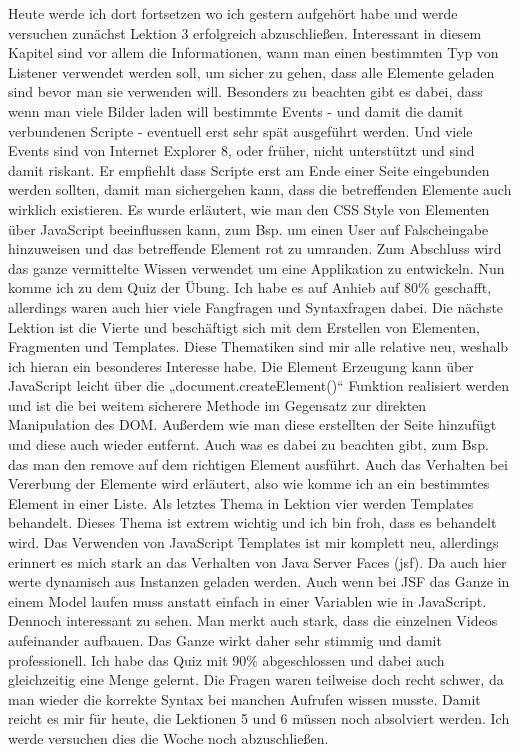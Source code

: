 \documentclass[12pt,a4paper,bibliography=totocnumbered,listof=totocnumbered]{scrartcl}
\begin{document}
Heute werde ich dort fortsetzen wo ich gestern aufgehört habe und werde versuchen zunächst Lektion 3 erfolgreich abzuschließen. 
Interessant in diesem Kapitel sind vor allem die Informationen, wann man einen bestimmten Typ von Listener verwendet werden soll, um sicher zu gehen, dass alle Elemente geladen sind bevor man sie verwenden will. Besonders zu beachten gibt es dabei, dass wenn man viele Bilder laden will bestimmte Events - und damit die damit verbundenen Scripte - eventuell erst sehr spät ausgeführt werden. Und viele Events sind von Internet Explorer 8, oder früher, nicht unterstützt und sind damit riskant. Er empfiehlt dass Scripte erst am Ende einer Seite eingebunden werden sollten, damit man sichergehen kann, dass die betreffenden Elemente auch wirklich existieren.  
Es wurde erläutert, wie man den CSS Style von Elementen über JavaScript beeinflussen kann, zum Bsp. um einen User auf Falscheingabe hinzuweisen und das betreffende Element rot zu umranden. 
Zum Abschluss wird das ganze vermittelte Wissen verwendet um eine Applikation zu entwickeln.  
Nun komme ich zu dem Quiz der Übung. Ich habe es auf Anhieb auf 80\% geschafft, allerdings waren auch hier viele Fangfragen und Syntaxfragen dabei. 
Die nächste Lektion ist die Vierte und beschäftigt sich mit dem Erstellen von Elementen, Fragmenten und Templates. 
Diese Thematiken sind mir alle relative neu, weshalb ich hieran ein besonderes Interesse habe. 
Die Element Erzeugung kann über JavaScript leicht über die „document.createElement()“ Funktion realisiert werden und ist die bei weitem sicherere Methode im Gegensatz zur direkten Manipulation des DOM. 
Außerdem wie man diese erstellten der Seite hinzufügt und diese auch wieder entfernt. Auch was es dabei zu beachten gibt, zum Bsp. das man den remove auf dem richtigen Element ausführt. Auch das Verhalten bei Vererbung der Elemente wird erläutert, also wie komme ich an ein bestimmtes Element in einer Liste. 
Als letztes Thema in Lektion vier werden Templates behandelt. Dieses Thema ist extrem wichtig und ich bin froh, dass es behandelt wird. Das Verwenden von JavaScript Templates ist mir komplett neu, allerdings erinnert es mich stark an das Verhalten von Java Server Faces (jsf). Da auch hier werte dynamisch aus Instanzen geladen werden. Auch wenn bei JSF das Ganze in einem Model laufen muss anstatt einfach in einer Variablen wie in JavaScript. Dennoch interessant zu sehen.  Man merkt auch stark, dass die einzelnen Videos aufeinander aufbauen. Das Ganze wirkt daher sehr stimmig und damit professionell. 
Ich habe das Quiz mit 90\% abgeschlossen und dabei auch gleichzeitig eine Menge gelernt. Die Fragen waren teilweise doch recht schwer, da man wieder die korrekte Syntax bei manchen Aufrufen wissen musste. 
Damit reicht es mir für heute, die Lektionen 5 und 6 müssen noch absolviert werden. Ich werde versuchen dies die Woche noch abzuschließen. 
\end{document}
